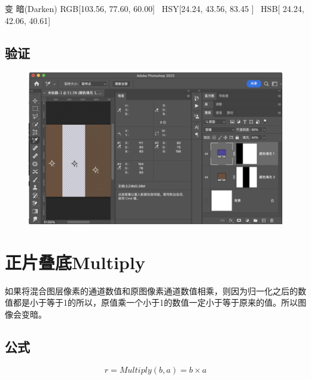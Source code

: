 \begin{result}
	\item 变    暗(Darken)        RGB[103.56,  77.60,  60.00]~ HSY[24.24,  43.56,  83.45 ]~ HSB[ 24.24,  42.06,  40.61]
\end{result}
\subsection{ 验证}
\begin{figure}[!htb]
	\centering
	\includegraphics[width=\linewidth]{figure/darken}
	\caption{}
	\label{fig:darken}
\end{figure}

%
%
%

\newpage
\section{ 正片叠底Multiply}

如果将混合图层像素的通道数值和原图像素通道数值相乘，则因为归一化之后的数值都是小于等于1的所以，原值乘一个小于1的数值一定小于等于原来的值。所以图像会变暗。

\subsection{ 公式}


\begin{equation}r=Multiply(b,a)=b\times a\end{equation}

